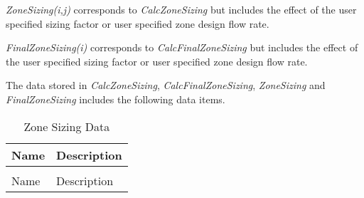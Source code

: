 \emph{ZoneSizing(i,j)} corresponds to \emph{CalcZoneSizing} but includes the effect of the user specified sizing factor or user specified zone design flow rate.

\emph{FinalZoneSizing(i)} corresponds to \emph{CalcFinalZoneSizing} but includes the effect of the user specified sizing factor or user specified zone design flow rate.

The data stored in \emph{CalcZoneSizing}, \emph{CalcFinalZoneSizing}, \emph{ZoneSizing} and \emph{FinalZoneSizing} includes the following data items.

\begin{longtable}[c]{p{1.85in}p{4.13in}}
\caption{Zone Sizing Data \label{table:zone-sizing-data}} \tabularnewline
\toprule 
Name & Description \tabularnewline
\midrule
\endfirsthead

\caption[]{Zone Sizing Data} \tabularnewline
\toprule 
Name & Description \tabularnewline
\midrule
\endhead


\end{longtable}

